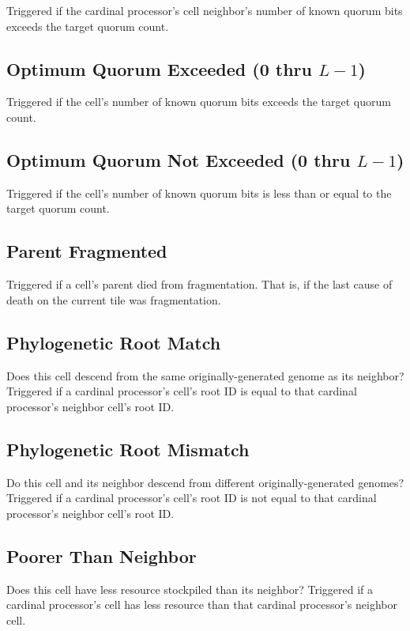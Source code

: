 Triggered if the cardinal processor's cell neighbor's number of known quorum bits exceeds the target quorum count.

\subsection{Optimum Quorum Exceeded (0 thru $L-1$)}

Triggered if the cell's number of known quorum bits exceeds the target quorum count.

\subsection{Optimum Quorum Not Exceeded (0 thru $L-1$)}

Triggered if the cell's number of known quorum bits is less than or equal to the target quorum count.

\subsection{Parent Fragmented}

Triggered if a cell's parent died from fragmentation.
That is, if the last cause of death on the current tile was fragmentation.

\subsection{Phylogenetic Root Match}

Does this cell descend from the same originally-generated genome as its neighbor?
Triggered if a cardinal processor's cell's root ID is equal to that cardinal processor's neighbor cell's root ID.

\subsection{Phylogenetic Root Mismatch}

Do this cell and its neighbor descend from different originally-generated genomes?
Triggered if a cardinal processor's cell's root ID is not equal to that cardinal processor's neighbor cell's root ID.

\subsection{Poorer Than Neighbor}

Does this cell have less resource stockpiled than its neighbor?
Triggered if a cardinal processor's cell has less resource than that cardinal processor's neighbor cell.

